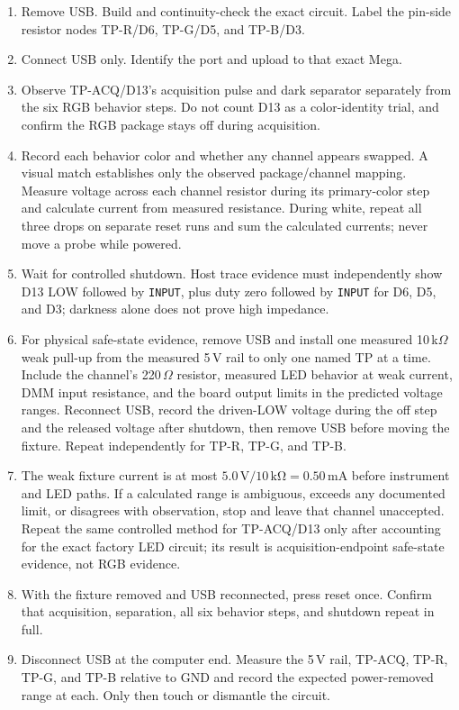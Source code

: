 \documentclass[11pt]{article}
\begin{document}
\begin{enumerate}
    \item Remove USB. Build and continuity-check the exact circuit. Label the
          pin-side resistor nodes TP-R/D6, TP-G/D5, and TP-B/D3.
    \item Connect USB only. Identify the port and upload to that exact Mega.
    \item Observe TP-ACQ/D13's acquisition pulse and dark separator separately
          from the six RGB behavior steps. Do not count D13 as a color-identity
          trial, and confirm the RGB package stays off during acquisition.
    \item Record each behavior color and whether any channel appears swapped.
          A visual match establishes only the observed package/channel mapping.
          Measure voltage across each channel resistor during its primary-color
          step and calculate current from measured resistance. During white,
          repeat all three drops on separate reset runs and sum the calculated
          currents; never move a probe while powered.
    \item Wait for controlled shutdown. Host trace evidence must independently
          show D13 LOW followed by \texttt{INPUT}, plus duty zero followed by
          \texttt{INPUT} for D6, D5, and D3; darkness alone does not prove high
          impedance.
    \item For physical safe-state evidence, remove USB and install one measured
          10\,k\(\Omega\) weak pull-up from the measured 5\,V rail to only one
          named TP at a time. Include the channel's 220\,\(\Omega\) resistor,
          measured LED behavior at weak current, DMM input resistance, and the
          board output limits in the predicted voltage ranges. Reconnect USB,
          record the driven-LOW voltage during the off step and the released
          voltage after shutdown, then remove USB before moving the fixture.
          Repeat independently for TP-R, TP-G, and TP-B.
    \item The weak fixture current is at most \(5.0\,\mathrm{V}/10\,\mathrm{k
          \Omega}=0.50\,\mathrm{mA}\) before instrument and LED paths. If a
          calculated range is ambiguous, exceeds any documented limit, or
          disagrees with observation, stop and leave that channel unaccepted.
          Repeat the same controlled method for TP-ACQ/D13 only after accounting
          for the exact factory LED circuit; its result is acquisition-endpoint
          safe-state evidence, not RGB evidence.
    \item With the fixture removed and USB reconnected, press reset once.
          Confirm that acquisition, separation, all six behavior steps, and
          shutdown repeat in full.
    \item Disconnect USB at the computer end. Measure the 5\,V rail, TP-ACQ,
          TP-R, TP-G, and TP-B relative to GND and record the expected
          power-removed range at each. Only then touch or dismantle the circuit.
\end{enumerate}
\end{document}
